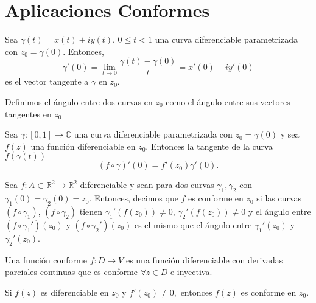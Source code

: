 \section{Aplicaciones Conformes}

\begin{defn}
  Sea $\gamma(t) = x(t) + i y(t)$, $0 \leq t < 1$ una curva diferenciable parametrizada con $z_{0} = \gamma(0)$. Entonces, 
  \[ 
    \gamma'(0) = \lim_{t \to 0} \frac{\gamma(t) - \gamma(0)}{t} = x'(0) + i y'(0) 
  \] 
  es el vector tangente a $\gamma$ en $z_{0}$.
\end{defn}

\begin{defn}
  Definimos el ángulo entre dos curvas en $z_{0}$ como el ángulo entre sus vectores tangentes en $z_{0}$
\end{defn}

\begin{theo}
  Sea $\gamma: [0,1] \to \mathbb{C}$ una curva diferenciable parametrizada con $z_{0} = \gamma(0)$ y sea $f(z)$ una función diferenciable en $z_{0}$. Entonces la tangente de la curva $f(\gamma(t))$
  \[ 
    (f \circ \gamma)'(0) = f'(z_{0}) \gamma'(0).
  \] 
\end{theo}

\begin{defn}
  Sea $f: A \subset \mathbb{R}^{2} \to \mathbb{R}^{2}$ diferenciable y sean para dos curvas $\gamma_{1}, \gamma_{2}$ con $\gamma_{1}(0) = \gamma_{2}(0) = z_{0}$. Entonces, decimos que $f$ es conforme en $z_{0}$ si las curvas $(f \circ \gamma_{1})$, $(f \circ \gamma_{2})$ tienen $\gamma_{1}'(f(z_{0})) \neq 0$, $\gamma_{2}'(f(z_{0})) \neq 0$ y el ángulo entre $(f \circ \gamma_{1}' )(z_{0})$ y $(f \circ \gamma_{2}')(z_{0})$ es el mismo que el ángulo entre $\gamma_{1}'(z_{0})$ y $\gamma_{2}'(z_{0})$.
\end{defn}

\begin{obs}
  Una función conforme $f: D \to V$ es una función diferenciable con derivadas parciales continuas que es conforme $\forall z \in D$ e inyectiva.
\end{obs}
 
\begin{theo}
  Si $f(z)$ es diferenciable en $z_{0}$ y $f'(z_{0}) \neq 0,$ entonces $f(z)$ es conforme en $z_{0}$.
\end{theo}
